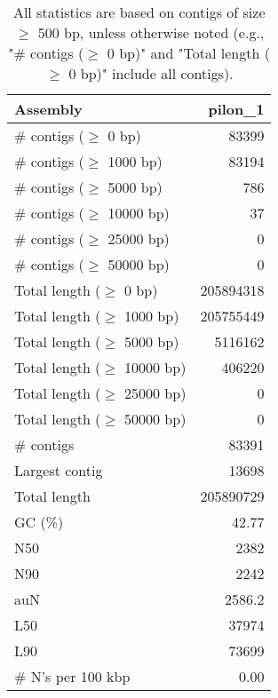 \documentclass[12pt,a4paper]{article}
\begin{document}
\begin{table}[ht]
\begin{center}
\caption{All statistics are based on contigs of size $\geq$ 500 bp, unless otherwise noted (e.g., "\# contigs ($\geq$ 0 bp)" and "Total length ($\geq$ 0 bp)" include all contigs).}
\begin{tabular}{|l*{1}{|r}|}
\hline
Assembly & pilon\_1 \\ \hline
\# contigs ($\geq$ 0 bp) & 83399 \\ \hline
\# contigs ($\geq$ 1000 bp) & 83194 \\ \hline
\# contigs ($\geq$ 5000 bp) & 786 \\ \hline
\# contigs ($\geq$ 10000 bp) & 37 \\ \hline
\# contigs ($\geq$ 25000 bp) & 0 \\ \hline
\# contigs ($\geq$ 50000 bp) & 0 \\ \hline
Total length ($\geq$ 0 bp) & 205894318 \\ \hline
Total length ($\geq$ 1000 bp) & 205755449 \\ \hline
Total length ($\geq$ 5000 bp) & 5116162 \\ \hline
Total length ($\geq$ 10000 bp) & 406220 \\ \hline
Total length ($\geq$ 25000 bp) & 0 \\ \hline
Total length ($\geq$ 50000 bp) & 0 \\ \hline
\# contigs & 83391 \\ \hline
Largest contig & 13698 \\ \hline
Total length & 205890729 \\ \hline
GC (\%) & 42.77 \\ \hline
N50 & 2382 \\ \hline
N90 & 2242 \\ \hline
auN & 2586.2 \\ \hline
L50 & 37974 \\ \hline
L90 & 73699 \\ \hline
\# N's per 100 kbp & 0.00 \\ \hline
\end{tabular}
\end{center}
\end{table}
\end{document}
